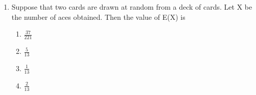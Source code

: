 \begin{enumerate}[label=\thechapter.\arabic*,ref=\thechapter.\theenumi]
\begin{enumerate}
\end{enumerate}

\item Suppose that two cards are drawn at random from a deck of cards. Let X be the
number of aces obtained. Then the value of E(X) is
\begin{enumerate}

\item $\frac{37}{221}$
\item $\frac{5}{13}$
\item $\frac{1}{13}$
\item $\frac{2}{13}$

\end{enumerate}

\end{enumerate}
